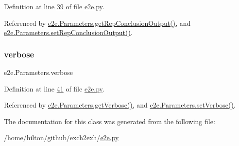 Definition at line \hyperlink{e2e_8py_source_l00039}{39} of file \hyperlink{e2e_8py_source}{e2e.\+py}.



Referenced by \hyperlink{e2e_8py_source_l00115}{e2e.\+Parameters.\+get\+Rep\+Conclusion\+Output()}, and \hyperlink{e2e_8py_source_l00118}{e2e.\+Parameters.\+set\+Rep\+Conclusion\+Output()}.

\mbox{\label{classe2e_1_1_parameters_a84d862bf507bb0325f5daf3b7e5d9ab3}} 
\subsubsection{\texorpdfstring{verbose}{verbose}}
{\footnotesize\ttfamily e2e.\+Parameters.\+verbose}



Definition at line \hyperlink{e2e_8py_source_l00041}{41} of file \hyperlink{e2e_8py_source}{e2e.\+py}.



Referenced by \hyperlink{e2e_8py_source_l00130}{e2e.\+Parameters.\+get\+Verbose()}, and \hyperlink{e2e_8py_source_l00127}{e2e.\+Parameters.\+set\+Verbose()}.



The documentation for this class was generated from the following file\+:\begin{DoxyCompactItemize}
\item 
/home/hilton/github/exch2exh/\hyperlink{e2e_8py}{e2e.\+py}\end{DoxyCompactItemize}
